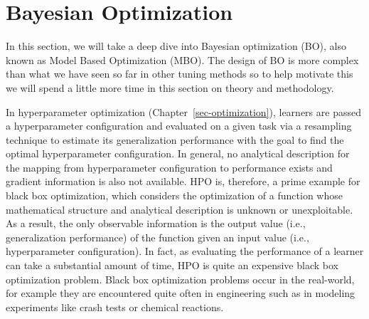 \hypertarget{sec-bayesian-optimization}{%
\section{Bayesian Optimization}\label{sec-bayesian-optimization}}

In this section, we will take a deep dive into Bayesian
optimization (BO), also known as Model
Based Optimization
(MBO). The
design of BO is more complex than what we have seen so far in other
tuning methods so to help motivate this we will spend a little more time
in this section on theory and methodology.

In hyperparameter optimization
(Chapter~\ref{sec-optimization}), learners are passed a hyperparameter
configuration and evaluated on a given task via a resampling technique
to estimate its generalization performance with the goal to find the
optimal hyperparameter configuration. In general, no analytical
description for the mapping from hyperparameter configuration to
performance exists and gradient information is also not available. HPO
is, therefore, a prime example for black box
optimization, which considers the optimization
of a function whose mathematical structure and analytical description is
unknown or unexploitable. As a result, the only observable information
is the output value (i.e., generalization performance) of the function
given an input value (i.e., hyperparameter configuration). In fact, as
evaluating the performance of a learner can take a substantial amount of
time, HPO is quite an expensive black box optimization problem. Black
box optimization problems occur in the real-world, for example they are
encountered quite often in engineering such as in modeling experiments
like crash tests or chemical reactions.


